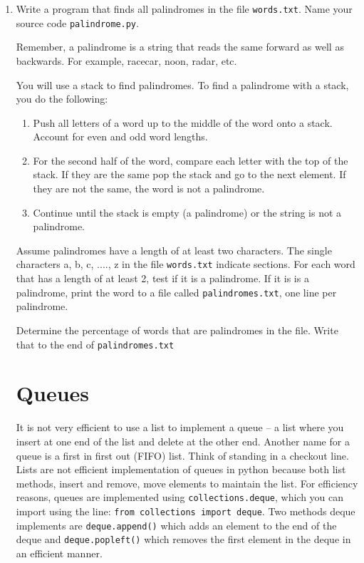 \documentclass[12pt]{article}
\begin{document}
\begin{enumerate}
\item Write a program that finds all palindromes in the file \texttt{words.txt}. Name your source code \texttt{palindrome.py}.  

  
Remember, a palindrome is a string that reads the same forward as well
 as backwards. For example, racecar, noon, radar, etc.

 You will use a stack to find palindromes. To find a palindrome with a stack, you do the following:
 \begin{enumerate}
\item Push all letters of a word up to the middle of the word onto a
 stack. Account for even and odd word lengths. 

\item For the second half of the word, compare each letter with the top of
 the stack. If they are the same pop the stack and go to the next
 element. If they are not the same, the word is not a palindrome.

\item Continue until the stack is empty (a palindrome) or the string is
 not a palindrome.
\end{enumerate}


 Assume palindromes have a length of at least two characters. The single characters a, b, c, ....,
 z in the file \texttt{words.txt} indicate sections. For each word that has a length
 of at least 2, test if it is a palindrome. If it is is a palindrome,
 print the word to a file called \texttt{palindromes.txt}, one line per
 palindrome. 

 Determine the percentage of words that are palindromes in the
 file. Write that to the end of \texttt{palindromes.txt}

\section*{Queues}

It is not very efficient to use a list to implement a queue -- a list where you insert at one end of the list and delete at the other end. Another name for a queue is a first in first out (FIFO) list. Think of standing in a checkout line. Lists are not efficient implementation of queues in python because both list methods, insert and remove, move elements to maintain the list. For efficiency reasons, queues are implemented using \texttt{collections.deque}, which you can import using the line: \texttt{from collections import deque}. Two methods deque implements are \texttt{deque.append()} which adds an element to the end of the deque and \texttt{deque.popleft()} which removes the first element in the deque in an efficient manner. 


\end{enumerate}
\end{document}
